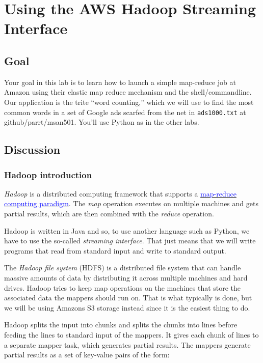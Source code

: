 \chapter{Using the AWS Hadoop Streaming Interface}

\setcounter{problem}{1}

\section{Goal}

\begin{fullwidth}

Your goal in this lab is to learn how to launch a simple map-reduce job at Amazon using their elastic map reduce mechanism and the shell/commandline. Our application is the trite ``word counting,'' which we will use to find the most common words in a set of Google ads scarfed from the net in {\tt ads1000.txt} at github/parrt/msan501. You'll use Python as in the other labs.

\section{Discussion}

\subsection{Hadoop introduction}

{\em Hadoop} is a distributed computing framework that supports a \href{http://wiki.apache.org/hadoop/HadoopMapReduce}{\textcolor{blue}{map-reduce computing paradigm}}. The {\em map} operation executes on multiple machines and gets partial results, which are then combined with the {\em reduce} operation. 

Hadoop is written in Java and so, to use another language such as Python, we have to use the so-called {\em streaming interface}. That just means that we will write programs that read from standard input and write to standard output. 

The {\em Hadoop file system} (HDFS) is a distributed file system that can handle massive amounts of data by distributing it across multiple machines and hard drives. Hadoop tries to keep map operations on the machines that store the associated data the mappers should run on. That is what typically is done, but we will be using Amazons S3 storage instead since it is the easiest thing to do.

Hadoop splits the input into chunks and splits the chunks into lines before feeding the lines to standard input of the mappers. It gives each chunk of lines to a separate mapper task, which generates partial results. The mappers generate partial results as a set of key-value pairs of the form:


\end{fullwidth}
